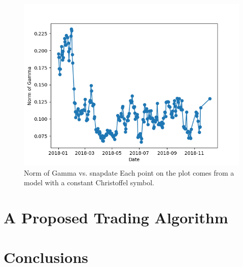 \documentclass{article}
\begin{document}
\begin{figure}\label{fig:gamma-time}
\includegraphics[bb=0 0 640 480]{figures/Gamma_time_2018.png}
\caption{Norm of Gamma vs. snapdate Each point on the plot comes from
  a model with a constant Christoffel symbol.}
\end{figure}

\section{A Proposed Trading Algorithm}\label{section:trading-algorithm}

\section{Conclusions}\label{section:conclusions}



\end{document}
